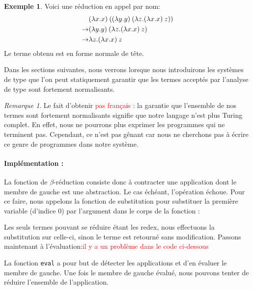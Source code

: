 \documentclass {article}
\newcommand{\codefrom}[3]
           {}
\theoremstyle{definition}
\newtheorem{example}{Exemple}
\theoremstyle{remark}
\newtheorem{remark}{Remarque}
\newcommand{\todo}[1]{\textcolor{red}{#1}}
\newcommand{\fun}[1]{\lstinline!#1!}
\begin{document}
\begin{example}
  Voici une réduction en appel par nom:
  \begin{align*}
    & (\lambda x. x)\:({(\lambda y. y)\:({\lambda z. (\lambda x. x)\:z}})) \\
    \rightarrow & (\lambda y. y)\:({\lambda z. (\lambda x. x)\:z})\\
    \rightarrow & \lambda z. (\lambda x. x)\:z
  \end{align*}
  Le terme obtenu est en forme normale de tête.
\end{example}

Dans les sections suivantes, nous verrons lorsque nous introduirons
les systèmes de type que l'on peut statiquement garantir que les
termes acceptés par l'analyse de type sont fortement normalisants.

\begin{remark}
  Le fait d'obtenir \todo{pas français :} la garantie que l'ensemble de nos termes sont fortement normalisants signifie que
  notre langage n'est plus Turing complet. En effet, nous ne pourrons plus exprimer les programmes
  qui ne terminent pas. Cependant, ce n'est pas gênant car nous ne cherchons pas à écrire ce genre de
  programmes dans notre système.
\end{remark}




\paragraph{Implémentation :}
La fonction de $\beta$-réduction consiste donc à contracter une
application dont le membre de gauche est une abstraction. Le cas
échéant, l'opération échoue. Pour ce faire, nous appelons la fonction
de substitution pour substituer la première variable (d'indice \(0\))
par l'argument dans le corps de la fonction : 
%
\codefrom{untyped}{lambda}{reduction}

Les seuls termes pouvant se réduire étant les redex, nous effectuons la substitution sur celle-ci,
sinon le terme est retourné sans modification.
Passons maintenant à l'évaluation:\todo{il y a un problème dans le code ci-dessous}

\codefrom{untyped}{lambda}{evaluation}
\codefrom{untyped}{lambda}{evaluation_bis}

La fonction \fun{eval} a pour but de détecter les applications et d'en évaluer le membre de gauche.
Une fois le membre de gauche évalué, nous pouvons tenter de réduire l'ensemble de l'application.
\end{document}

